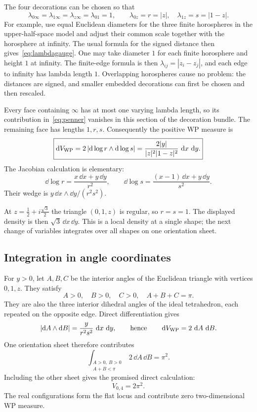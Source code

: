 The four decorations can be chosen so that
\begin{equation}
 \lambda_{0\infty}=\lambda_{1\infty}=\lambda_{z\infty}
 =\lambda_{01}=1,
 \qquad \lambda_{0z}=r=|z|,\quad\lambda_{1z}=s=|1-z|.
 \label{eq:lambdagauge}
\end{equation}
For example, use equal Euclidean diameters for the three finite horospheres
in the upper-half-space model and adjust their common scale together with
the horosphere at infinity. The usual formula for the signed distance then
gives~\eqref{eq:lambdagauge}.
One may take diameter $1$ for each finite horosphere and height $1$ at
infinity. The finite-edge formula is then
$\lambda_{ij}=|z_i-z_j|$, and each edge to infinity has lambda length $1$.
Overlapping horospheres cause no problem: the distances are signed, and
smaller embedded decorations can first be chosen and then rescaled.

Every face containing $\infty$ has at most one varying lambda length, so its
contribution in~\eqref{eq:penner} vanishes in this section of the decoration
bundle. The remaining face has lengths $1,r,s$. Consequently the positive
WP measure is
\begin{equation}
 \boxed{
 \mathop{}\!\mathrm d V_{\mathrm{WP}}=2\left|\mathop{}\!\mathrm d\log r\wedge\mathop{}\!\mathrm d\log s\right|
      =\frac{2|y|}{|z|^2|1-z|^2}\,\mathop{}\!\mathrm d x\,\mathop{}\!\mathrm d y.}
 \label{eq:tetdensity}
\end{equation}
The Jacobian calculation is elementary:
\[
 \dd\log r=\frac{x\,\dd x+y\,\dd y}{r^2},\qquad
 \dd\log s=\frac{(x-1)\,\dd x+y\,\dd y}{s^2}.
\]
Their wedge is $y\,\dd x\wedge\dd y/(r^2s^2)$.

At $z=\tfrac12+i\tfrac{\sqrt3}{2}$ the triangle $(0,1,z)$ is
regular, so $r=s=1$. The displayed density is then
$\sqrt3\,\dd x\,\dd y$. This is a local density at a single
shape; the next change of variables integrates over all shapes
on one orientation sheet.

\subsection{Integration in angle coordinates}

For $y>0$, let $A,B,C$ be the interior angles of the Euclidean triangle
with vertices $0,1,z$. They satisfy
\[
 A>0,\quad B>0,\quad C>0,\quad A+B+C=\pi.
\]
They are also the three interior dihedral angles of the ideal tetrahedron,
each repeated on the opposite edge. Direct differentiation gives
\[
 \left|\mathop{}\!\mathrm d A\wedge\mathop{}\!\mathrm d B\right|
   =\frac{y}{r^2s^2}\,\mathop{}\!\mathrm d x\,\mathop{}\!\mathrm d y,
 \qquad\text{hence}\qquad
 \mathop{}\!\mathrm d V_{\mathrm{WP}}=2\,\mathop{}\!\mathrm d A\,\mathop{}\!\mathrm d B.
\]
One orientation sheet therefore contributes
\begin{equation}
 \int_{\substack{A>0,\ B>0\\A+B<\pi}}2\,\dd A\,\dd B=\pi^2.
 \label{eq:onecell}
\end{equation}
Including the other sheet gives the promised direct calculation:
\begin{equation}
 \boxed{V_{0,4}=2\pi^2.}
 \label{eq:v04direct}
\end{equation}
The real configurations form the flat locus and contribute zero two-dimensional
WP measure.

